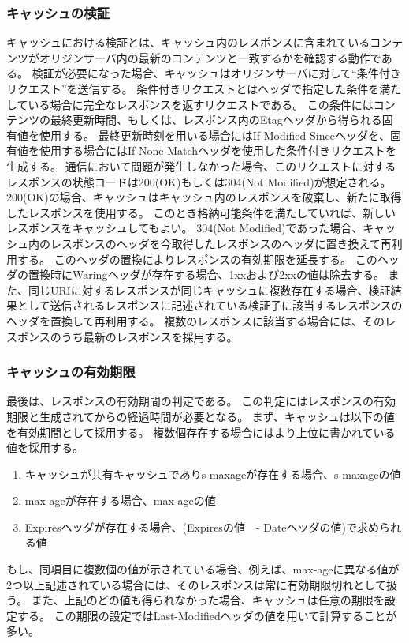 \documentclass{css}
\begin{document}
\subsubsection{キャッシュの検証}
キャッシュにおける検証とは、キャッシュ内のレスポンスに含まれているコンテンツがオリジンサーバ内の最新のコンテンツと一致するかを確認する動作である。
検証が必要になった場合、キャッシュはオリジンサーバに対して``条件付きリクエスト''を送信する。
条件付きリクエストとはヘッダで指定した条件を満たしている場合に完全なレスポンスを返すリクエストである。
この条件にはコンテンツの最終更新時間、もしくは、レスポンス内のEtagヘッダから得られる固有値を使用する。
最終更新時刻を用いる場合にはIf-Modified-Sinceヘッダを、固有値を使用する場合にはIf-None-Matchヘッダを使用した条件付きリクエストを生成する。
通信において問題が発生しなかった場合、このリクエストに対するレスポンスの状態コードは200(OK)もしくは304(Not Modified)が想定される。
200(OK)の場合、キャッシュはキャッシュ内のレスポンスを破棄し、新たに取得したレスポンスを使用する。
このとき格納可能条件を満たしていれば、新しいレスポンスをキャッシュしてもよい。
304(Not Modified)であった場合、キャッシュ内のレスポンスのヘッダを今取得したレスポンスのヘッダに置き換えて再利用する。
このヘッダの置換によりレスポンスの有効期限を延長する。
このヘッダの置換時にWaringヘッダが存在する場合、1xxおよび2xxの値は除去する。
また、同じURIに対するレスポンスが同じキャッシュに複数存在する場合、検証結果として送信されるレスポンスに記述されている検証子に該当するレスポンスのヘッダを置換して再利用する。
複数のレスポンスに該当する場合には、そのレスポンスのうち最新のレスポンスを採用する。

\subsubsection{キャッシュの有効期限}
\label{sec:expiration}
最後は、レスポンスの有効期間の判定である。
この判定にはレスポンスの有効期限と生成されてからの経過時間が必要となる。
まず、キャッシュは以下の値を有効期間として採用する。
複数個存在する場合にはより上位に書かれている値を採用する。
\begin{enumerate}
\item キャッシュが共有キャッシュでありs-maxageが存在する場合、s-maxageの値
\item max-ageが存在する場合、max-ageの値
\item Expiresヘッダが存在する場合、(Expiresの値　- Dateヘッダの値)で求められる値
\end{enumerate}
もし、同項目に複数個の値が示されている場合、例えば、max-ageに異なる値が2つ以上記述されている場合には、そのレスポンスは常に有効期限切れとして扱う。
また、上記のどの値も得られなかった場合、キャッシュは任意の期限を設定する。
この期限の設定ではLast-Modifiedヘッダの値を用いて計算することが多い。
\end{document}

